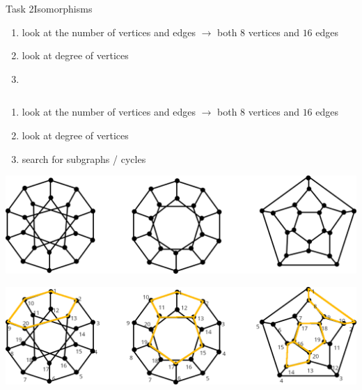 \begin{frame}[allowframebreaks]{Task 2}{Isomorphisms}
\begin{solutionnoinc}
    \begin{enumerate}
      \item look at the \alert{number} of \alert{vertices} and \alert{edges} $\rightarrow$ both $8$ vertices and $16$ edges
      \item look at \alert{degree} of vertices
      \item[]
    \end{enumerate}
  \end{solutionnoinc}
  \begin{solution}
    \begin{columns}
      \begin{column}{0.5\textwidth}
      \end{column}
      \begin{column}{0.5\textwidth}
      \end{column}
    \end{columns}
    \vspace{0.5cm}
    \begin{enumerate}
      \item look at the \alert{number} of \alert{vertices} and \alert{edges} $\rightarrow$ both $8$ vertices and $16$ edges
      \item look at \alert{degree} of vertices
      \item search for \alert{subgraphs} / \alert{cycles}
    \end{enumerate}
  \end{solution}
  \begin{requirementsnoinc}
    \includegraphics[width=\textwidth]{./figures/isomorphism2.png}
  \end{requirementsnoinc}
  \begin{solutionnoinc}
    \includegraphics[width=\textwidth]{./figures/isomorphism2_sol.png}

\end{solutionnoinc}
\end{frame}
